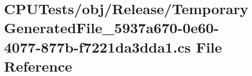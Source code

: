 \hypertarget{_c_p_u_tests_2obj_2_release_2_temporary_generated_file__5937a670-0e60-4077-877b-f7221da3dda1_8cs}{}\section{C\+P\+U\+Tests/obj/\+Release/\+Temporary\+Generated\+File\+\_\+5937a670-\/0e60-\/4077-\/877b-\/f7221da3dda1.cs File Reference}
\label{_c_p_u_tests_2obj_2_release_2_temporary_generated_file__5937a670-0e60-4077-877b-f7221da3dda1_8cs}
